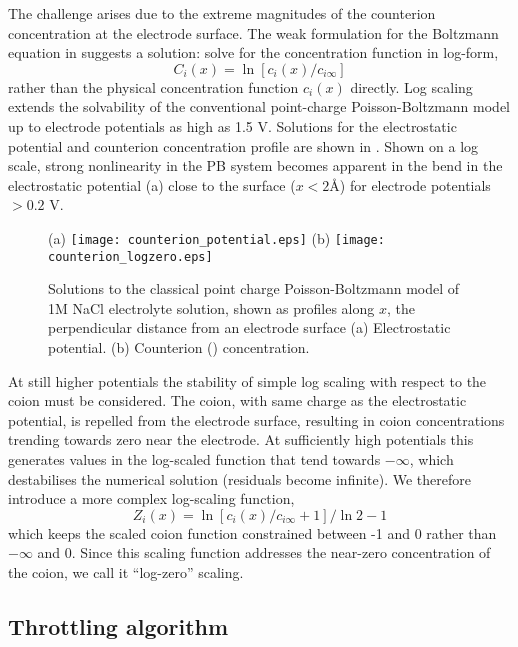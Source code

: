The challenge arises due to the extreme magnitudes of the counterion
concentration at the electrode surface. The weak formulation for the
Boltzmann equation in  suggests a solution:
solve for the concentration function in log-form,
\begin{equation}
C_{i}(x) = \ln[ c_{i}(x) / c_{i\infty}]
\label{log_scaling}
\end{equation}
rather than the physical concentration function $c_{i}(x)$ directly. Log
scaling extends the solvability of the conventional point-charge Poisson-Boltzmann
model up to electrode potentials as high as 1.5 V. Solutions for the
electrostatic potential and counterion concentration profile are shown
in . Shown on a log scale, strong
nonlinearity in the PB system becomes apparent in the bend in the
electrostatic potential (a) close to the
surface ($x<2$\AA) for electrode potentials $> 0.2$ V.


\begin{figure}
\centering
(a)
\texttt{[image: counterion\_potential.eps]}
(b)
\texttt{[image: counterion\_logzero.eps]}
\caption{\label{fig_classical_PB}Solutions to the classical point
  charge Poisson-Boltzmann model of 1M NaCl electrolyte solution,
  shown as profiles along $x$, the perpendicular distance from an
  electrode surface (a) Electrostatic potential. (b) Counterion
  () concentration. }
\end{figure}

At still higher potentials the stability of simple log scaling with
respect to the coion must be considered. The coion, with same charge
as the electrostatic potential, is repelled from the electrode surface,
resulting in coion concentrations trending towards zero near the electrode. At
sufficiently high potentials this generates values in the log-scaled
function that tend towards $-\infty$, which destabilises the numerical
solution (residuals become infinite). We therefore introduce a more complex log-scaling function,
\begin{equation}
Z_i(x) = \ln\left[c_i(x)/c_{i\infty}+1\right]/\ln 2 - 1
\label{log_zero}
\end{equation}
which keeps the scaled coion function constrained between -1 and 0
rather than $-\infty$ and 0. Since this scaling function addresses the
near-zero concentration of the coion, we call it ``log-zero'' scaling.

\subsection{Throttling algorithm}

